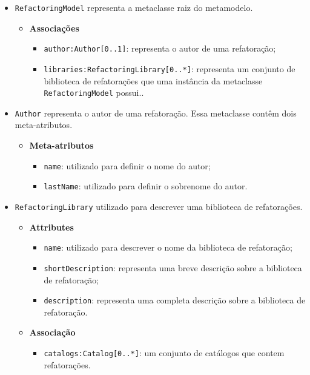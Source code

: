 \begin{itemize}
\item \texttt{RefactoringModel} representa a metaclasse raiz do metamodelo.

\begin{itemize}
	\item \textbf{Associações}
		\begin{itemize}
			\item \texttt{author:Author[0..1]}: representa o autor de uma refatoração; 
			\item \texttt{libraries:RefactoringLibrary[0..*]}: representa um conjunto de biblioteca de refatorações que uma instância da metaclasse \texttt{RefactoringModel} possui..
		\end{itemize}
\end{itemize}

\item \texttt{Author} representa o autor de uma refatoração. Essa metaclasse contêm dois meta-atributos.

\begin{itemize}
	\item \textbf{Meta-atributos}
		\begin{itemize}
			\item \texttt{name}: utilizado para definir o nome do autor;
			\item \texttt{lastName}: utilizado para definir o sobrenome do autor.
		\end{itemize}	
\end{itemize} 

\item \texttt{RefactoringLibrary} utilizado para descrever uma biblioteca de refatorações.

\begin{itemize}
	\item \textbf{Attributes}
		\begin{itemize}
			\item \texttt{name}: utilizado para descrever o nome da biblioteca de refatoração;
			\item \texttt{shortDescription}: representa uma breve descrição sobre a biblioteca de refatoração;
			\item \texttt{description}: representa uma completa descrição sobre a biblioteca de refatoração.
		\end{itemize}	
\end{itemize} 

\begin{itemize}
	\item \textbf{Associação}
		\begin{itemize}
			\item \texttt{catalogs:Catalog[0..*]}: um conjunto de catálogos que contem refatorações.
		\end{itemize}	
\end{itemize} 


\end{itemize}
